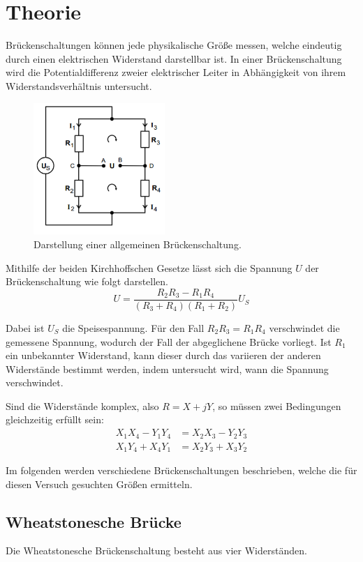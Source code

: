 \section{Theorie}
\label{sec:Theorie}

Brückenschaltungen können jede physikalische Größe messen, welche eindeutig durch einen
elektrischen Widerstand darstellbar ist. In einer Brückenschaltung wird die Potentialdifferenz zweier elektrischer Leiter
in Abhängigkeit von ihrem Widerstandsverhältnis untersucht.


\begin{figure}[H]
  \centering
  \includegraphics[height=5cm]{bruecke.PNG}
  \caption{Darstellung einer allgemeinen Brückenschaltung. \cite{sample}}
  \label{fig:Brückenschaltung}
\end{figure}

Mithilfe der beiden Kirchhoffschen Gesetze lässt sich die Spannung $U$ der Brückenschaltung wie folgt darstellen.
\begin{equation}
  U = \frac{R_2 R_3 - R_1 R_4}{(R_3+R_4)(R_1+R_2)}U_S
\end{equation}

Dabei ist $U_S$ die Speisespannung. Für den Fall $R_2R_3=R_1R_4$ verschwindet die gemessene Spannung, wodurch der Fall
der abgeglichene Brücke vorliegt. Ist $R_1$ ein unbekannter Widerstand, kann dieser durch das variieren der anderen Widerstände bestimmt werden,
indem untersucht wird, wann die Spannung verschwindet.

Sind die Widerstände komplex, also $R= X + jY$, so müssen zwei Bedingungen gleichzeitig erfüllt sein:
\begin{align}
  X_1X_4 -Y_1Y_4 &= X_2X_3 - Y_2Y_3 \\
  X_1Y_4 +X_4Y_1 &= X_2Y_3 + X_3Y_2
\end{align}


Im folgenden werden verschiedene
Brückenschaltungen beschrieben, welche die für diesen Versuch gesuchten Größen ermitteln.

\subsection{Wheatstonesche Brücke}
Die Wheatstonesche Brückenschaltung besteht aus vier Widerständen.

